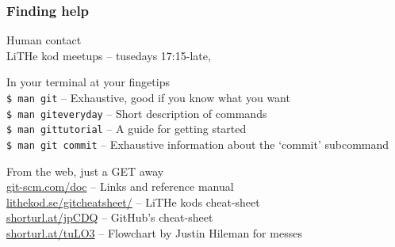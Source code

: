 \documentclass{beamer}
\begin{document}
\begin{frame}[fragile]
  \frametitle{Finding help}

  Human contact \\
  \hspace{1em} LiTHe kod meetups -- tusedays 17:15-late,  \\
  \vspace{1em}

  In your terminal at your fingetips \\
  \hspace{1em} \texttt{\$ man git} -- Exhaustive, good if you know what you want \\
  \hspace{1em} \texttt{\$ man giteveryday} -- Short description of commands \\
  \hspace{1em} \texttt{\$ man gittutorial} -- A guide for getting started \\
  \hspace{1em} \texttt{\$ man git commit} -- Exhaustive information about the `commit' subcommand\\
  \vspace{1em}

  From the web, just a GET away \\
  \hspace{1em} \url{git-scm.com/doc} -- Links and reference manual \\
  \hspace{1em} \url{lithekod.se/gitcheatsheet/} -- LiTHe kods cheat-sheet \\
  \hspace{1em} \url{shorturl.at/jpCDQ} -- GitHub's cheat-sheet \\
  \hspace{1em} \url{shorturl.at/tuLO3} -- Flowchart by Justin Hileman for messes\\

\end{frame}
\end{document}
